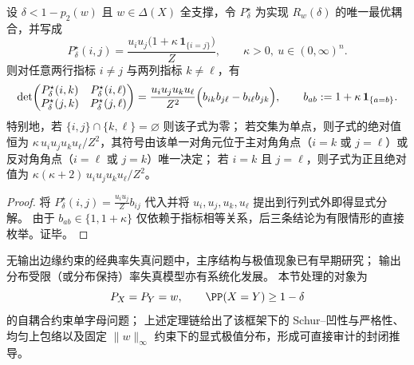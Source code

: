 \begin{proposition}[最优耦合的二阶子式符号刚性]\label{prop:pom-diagonal-rate-optimal-coupling-minor-sign-rigidity}
设 \(\delta<1-p_2(w)\) 且 \(w\in\Delta(X)\) 全支撑，令 \(P^\star_\delta\) 为实现 \(R_w(\delta)\) 的唯一最优耦合，并写成
\[
P^\star_\delta(i,j)=\frac{u_i u_j\bigl(1+\kappa\,\mathbf 1_{\{i=j\}}\bigr)}{Z},
\qquad
\kappa>0,\ u\in(0,\infty)^n.
\]
则对任意两行指标 \(i\ne j\) 与两列指标 \(k\ne \ell\)，有
\[
\det\!\begin{pmatrix}
P^\star_\delta(i,k) & P^\star_\delta(i,\ell)\\
P^\star_\delta(j,k) & P^\star_\delta(j,\ell)
\end{pmatrix}
=\frac{u_i u_j u_k u_\ell}{Z^2}\Bigl(b_{ik}b_{j\ell}-b_{i\ell}b_{jk}\Bigr),
\qquad
b_{ab}:=1+\kappa\,\mathbf 1_{\{a=b\}}.
\]
特别地，若 \(\{i,j\}\cap\{k,\ell\}=\varnothing\) 则该子式为零；
若交集为单点，则子式的绝对值恒为 \(\kappa\,u_i u_j u_k u_\ell/Z^2\)，其符号由该单一对角元位于主对角角点（\(i=k\) 或 \(j=\ell\)）或反对角角点（\(i=\ell\) 或 \(j=k\)）唯一决定；
若 \(i=k\) 且 \(j=\ell\)，则子式为正且绝对值为 \(\kappa(\kappa+2)\,u_i u_j u_k u_\ell/Z^2\)。
\end{proposition}
\begin{proof}
将 \(P^\star_\delta(i,j)=\frac{u_i u_j}{Z}b_{ij}\) 代入并将 \(u_i,u_j,u_k,u_\ell\) 提出到行列式外即得显式分解。
由于 \(b_{ab}\in\{1,1+\kappa\}\) 仅依赖于指标相等关系，后三条结论为有限情形的直接枚举。证毕。
\end{proof}

\begin{remark}[文献边界说明]\label{rem:pom-diagonal-rate-literature-boundary-note}
无输出边缘约束的经典率失真问题中，主序结构与极值现象已有早期研究；
输出分布受限（或分布保持）率失真模型亦有系统化发展。
本节处理的对象为
\[
P_X=P_Y=w,\qquad \PP(X=Y)\ge 1-\delta
\]
的自耦合约束单字母问题；
上述定理链给出了该框架下的 Schur--凹性与严格性、均匀上包络以及固定 \(\|w\|_\infty\) 约束下的显式极值分布，形成可直接审计的封闭推导。
\end{remark}

